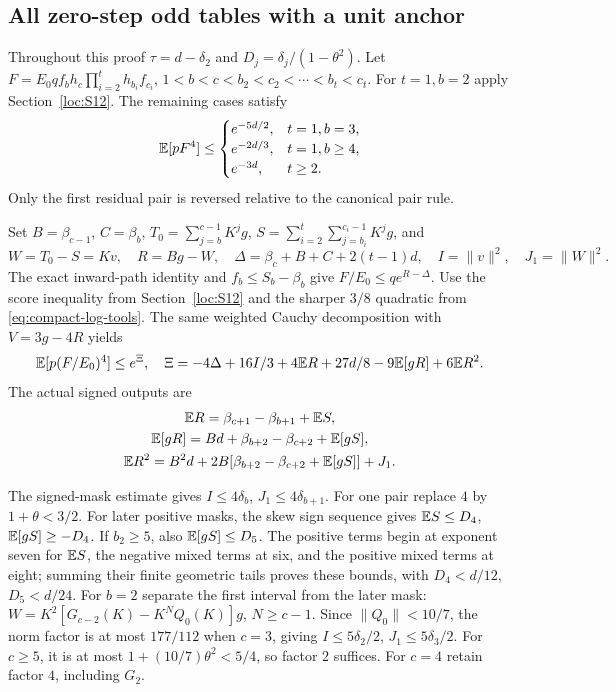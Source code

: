 \subsection{All zero-step odd tables with a unit anchor}\label{loc:S14}
Throughout this proof $\tau=d-\delta_{2}$ and $D_j=\delta_{j}/(1-\theta^2)$.
Let
$F=E_0qf_bh_c\prod_{i=2}^th_{b_i}f_{c_i}$,
$1<b<c<b_2<c_2<\cdots<b_t<c_t$.
For $t=1,b=2$ apply Section~\ref{loc:S12}.
The remaining cases satisfy
\[
 \mathbb E[pF^4]\le
 \begin{cases}e^{-5d/2},&t=1,b=3,\\
 e^{-2d/3},&t=1,b\ge4,\\e^{-3d},&t\ge2.
 \end{cases}
\]
Only the first residual pair is reversed relative to the canonical pair rule.

Set $B=\beta_{c-1}$, $C=\beta_b$,
$T_0=\sum_{j=b}^{c-1}K^jg$,
$S=\sum_{i=2}^t\sum_{j=b_i}^{c_i-1}K^jg$, and
\[
 W=T_0-S=Kv,\quad R=Bg-W,\quad
 \Delta=\beta_c+B+C+2(t-1)d,\quad I=\|v\|^2,\quad J_1=\|W\|^2.
\]
The exact inward-path identity and $f_b\le S_b-\beta_b$ give
$F/E_0\le q e^{R-\Delta}$.
Use the score inequality from Section~\ref{loc:S12} and the sharper
$3/8$ quadratic from \eqref{eq:compact-log-tools}.
The same weighted Cauchy decomposition with $V=3g-4R$ yields
\begin{equation}\label{eq:compact-unit-odd-master}
 \mathbb E[p(F/E_0)^4]\le e^\Xi,\quad
 \Xi=-4\Delta+16I/3+4\mathbb E R+27d/8-9\mathbb E[gR]+6\mathbb E R^2.
\end{equation}
The actual signed outputs are
\begin{gather*}
 \mathbb E R=\beta_{c+1}-\beta_{b+1}+\mathbb E S,\\
 \mathbb E[gR]=Bd+\beta_{b+2}-\beta_{c+2}+\mathbb E[gS],\\
 \mathbb E R^2=B^2d+2B[\beta_{b+2}-\beta_{c+2}+\mathbb E[gS]]+J_1.
\end{gather*}

The signed-mask estimate gives $I\le4\delta_{b}$, $J_1\le4\delta_{b+1}$.
For one pair replace $4$ by $1+\theta<3/2$.
For later positive masks, the skew sign sequence gives
$\mathbb E S\le D_4$, $\mathbb E[gS]\ge-D_4$.
If $b_2\ge5$, also $\mathbb E[gS]\le D_5$.
The positive terms begin at exponent seven for $\mathbb E S$, the negative mixed
terms at six, and the positive mixed terms at eight; summing their finite
geometric tails proves these bounds, with $D_4<d/12$, $D_5<d/24$.
For $b=2$ separate the first interval from the later mask:
$W=K^2[G_{c-2}(K)-K^NQ_0(K)]g$, $N\ge c-1$.
Since $\|Q_0\|<10/7$, the norm factor is at most $177/112$ when
$c=3$, giving $I\le5\delta_{2}/2$, $J_1\le5\delta_{3}/2$.
For $c\ge5$, it is at most $1+(10/7)\theta^2<5/4$,
so factor $2$ suffices. For $c=4$ retain factor $4$, including $G_2$.

